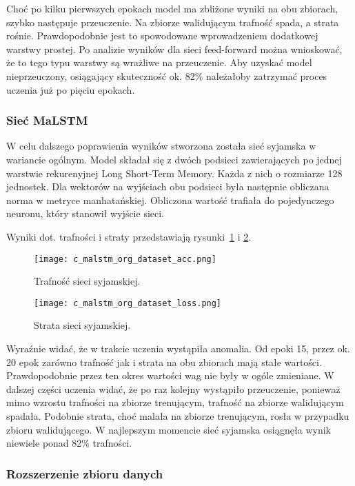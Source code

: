Choć po kilku pierwszych epokach model ma zbliżone wyniki na obu zbiorach, szybko następuje przeuczenie. Na zbiorze walidującym trafność spada, a strata rośnie. Prawdopodobnie jest to spowodowane wprowadzeniem dodatkowej warstwy prostej. Po analizie wyników dla sieci feed-forward można wnioskować, że to tego typu warstwy są wrażliwe na przeuczenie. Aby uzyskać model nieprzeuczony, osiągający skuteczność ok. 82\% należałoby zatrzymać proces uczenia już po pięciu epokach.

\subsubsection{Sieć MaLSTM}
W celu dalszego poprawienia wyników stworzona została sieć syjamska w wariancie ogólnym. Model składał się z dwóch podsieci zawierających po jednej warstwie rekurenyjnej Long Short-Term Memory. Każda z nich o rozmiarze 128 jednostek. Dla wektorów na wyjściach obu podsieci była następnie obliczana norma w metryce manhatańskiej. Obliczona wartość trafiała do pojedynczego neuronu, który stanowił wyjście sieci.

Wyniki dot. trafności i straty przedstawiają rysunki~\ref{c_siamese_acc} i \ref{c_siamese_loss}.

\begin{figure}[H]
\centering
\texttt{[image: c\_malstm\_org\_dataset\_acc.png]}
\caption{Trafność sieci syjamskiej.}
\label{c_siamese_acc}
\end{figure}

\begin{figure}[H]
\centering
\texttt{[image: c\_malstm\_org\_dataset\_loss.png]}
\caption{Strata sieci syjamskiej.}
\label{c_siamese_loss}
\end{figure}

Wyraźnie widać, że w trakcie uczenia wystąpiła anomalia. Od epoki 15, przez ok. 20 epok zarówno trafność jak i strata na obu zbiorach mają stałe wartości. Prawdopodobnie przez ten okres wartości wag nie były w ogóle zmieniane. W dalszej części uczenia widać, że po raz kolejny wystąpiło przeuczenie, ponieważ mimo wzrostu trafności na zbiorze trenującym, trafność na zbiorze walidującym spadała. Podobnie strata, choć malała na zbiorze trenującym, rosła w przypadku zbioru walidującego. W najlepszym momencie sieć syjamska osiągnęła wynik niewiele ponad 82\% trafności.

\subsubsection{Rozszerzenie zbioru danych}


